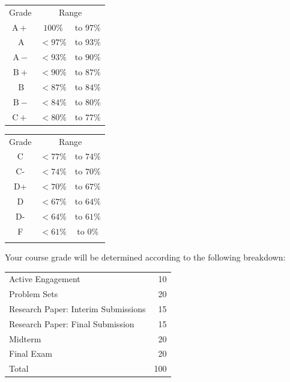 \documentclass{syllabus}
\begin{document}
\begin{center}
\begin{minipage}[t]{0.75\textwidth}
\begin{tabular}{|ccc|}
\hline
Grade & \multicolumn{2}{c|}{Range} \\
$\mathrm{A}+$ & $100 \%$ & to $97 \%$ \\
$\mathrm{~A}$ & $<97 \%$ & to $93 \%$ \\
$\mathrm{~A}-$ & $<93 \%$ & to $90 \%$ \\
$\mathrm{~B}+$ & $<90 \%$ & to $87 \%$ \\
$\mathrm{~B}$ & $<87 \%$ & to $84 \%$ \\
$\mathrm{~B}-$ & $<84 \%$ & to $80 \%$ \\
$\mathrm{C}+$ & $<80 \%$ & to $77 \%$ \\
\hline
\end{tabular} \hspace{2cm}
\begin{tabular}{|ccc|}
\hline
Grade & \multicolumn{2}{c|}{Range} \\
C & $<77 \%$ & to $74 \%$ \\
C- & $<74 \%$ & to $70 \%$ \\
D+ & $<70 \%$ & to $67 \%$ \\
D & $<67 \%$ & to $64 \%$ \\
D- & $<64 \%$ & to $61 \%$ \\
F & $<61 \%$ & to $0 \%$ \\
 &  &  \\
\hline
\end{tabular}
\end{minipage}
\end{center} 

\newpage
Your course grade will be determined according to the following breakdown:

\begin{center}
\begin{tabularx}{0.65\textwidth}{Xr}
\hline

Active Engagement & 10 \\
Problem Sets & 20 \\
Research Paper: Interim Submissions & 15 \\
Research Paper: Final Submission & 15 \\
Midterm & 20 \\
Final Exam & 20 \\
\hline
Total & 100 \\
\hline
\end{tabularx}
\end{center}
\end{document}
